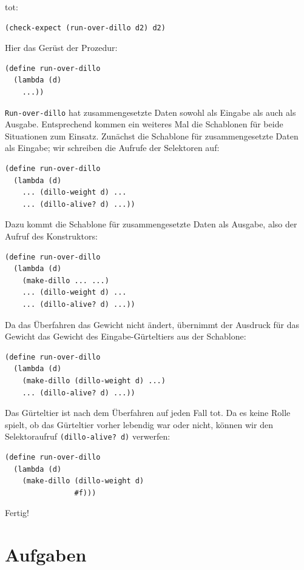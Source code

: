 tot:
%
\begin{verbatim}
(check-expect (run-over-dillo d2) d2)
\end{verbatim}
%
Hier das Gerüst der Prozedur:
%
\begin{verbatim}
(define run-over-dillo
  (lambda (d)
    ...))
\end{verbatim}
%
\texttt{Run-over-dillo} hat zusammengesetzte Daten sowohl als Eingabe
als auch als Ausgabe.  Entsprechend kommen ein weiteres Mal die
Schablonen für beide Situationen zum Einsatz.  Zunächst die Schablone
für zusammengesetzte Daten als Eingabe; wir schreiben die Aufrufe der
Selektoren auf:
%
\begin{verbatim}
(define run-over-dillo
  (lambda (d)
    ... (dillo-weight d) ...
    ... (dillo-alive? d) ...))
\end{verbatim}
%
Dazu kommt die Schablone für zusammengesetzte Daten als Ausgabe, also
der Aufruf des Konstruktors:
%
\begin{verbatim}
(define run-over-dillo
  (lambda (d)
    (make-dillo ... ...)
    ... (dillo-weight d) ...
    ... (dillo-alive? d) ...))
\end{verbatim}
%
  Da das Überfahren das Gewicht nicht ändert, übernimmt
der Ausdruck für das Gewicht das Gewicht des Eingabe-Gürteltiers aus
der Schablone:
%
\begin{verbatim}
(define run-over-dillo
  (lambda (d)
    (make-dillo (dillo-weight d) ...)
    ... (dillo-alive? d) ...))
\end{verbatim}
%
Das Gürteltier ist nach dem Überfahren auf jeden Fall tot.  Da es
keine Rolle spielt, ob das Gürteltier vorher lebendig war oder nicht,
können wir den Selektoraufruf \texttt{(dillo-alive? d)} verwerfen:
%
\begin{verbatim}
(define run-over-dillo
  (lambda (d)
    (make-dillo (dillo-weight d)
                #f)))
\end{verbatim}
%
Fertig!

\section*{Aufgaben}

